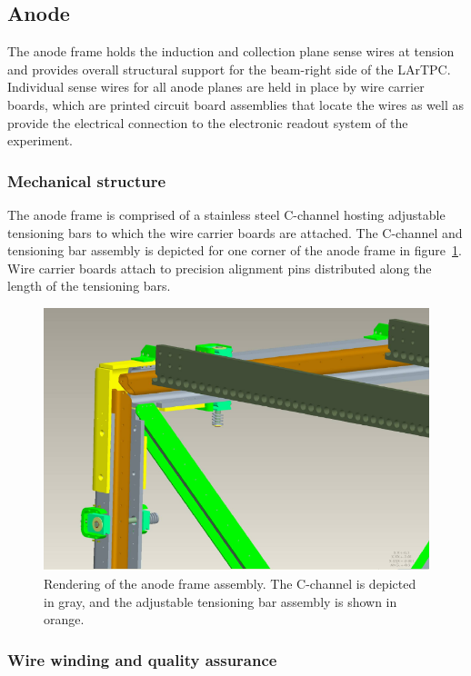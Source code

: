 \subsection{Anode}

The anode frame holds the induction and collection plane sense wires at tension and provides overall structural support for the beam-right side of the LArTPC.  Individual sense wires for all anode planes are held in place by wire carrier boards, which are printed circuit board assemblies that locate the wires as well as provide the electrical connection to the electronic readout system of the experiment.

\subsubsection{Mechanical structure}

The anode frame is comprised of a stainless steel C-channel hosting adjustable tensioning bars to which the wire carrier boards are attached. The C-channel and tensioning bar assembly is depicted for one corner of the anode frame in figure~\ref{fig:anode-frame-3dmodel}.  Wire carrier boards attach to precision alignment pins distributed along the length of the tensioning bars. 

\begin{figure}[htb]
\centering	
\includegraphics[width=0.8\linewidth]{figures/anode-frame-3dmodel.pdf}
\caption{Rendering of the anode frame assembly.  The C-channel is depicted in gray, and the adjustable tensioning bar assembly is shown in orange.}
\label{fig:anode-frame-3dmodel}
\end{figure}

\subsubsection{Wire winding and quality assurance}

